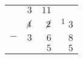 \documentclass{standalone}
\begin{document}
\begin{tabular}{rrrr}
	& {\small $3$} & {\small$11$} &  \\
	& $\cancel{4}$ & $\cancel{2}$ & \textsuperscript{$1$} $3$ \\
	$-$ & $3$ & $6$ & $8$ \\ \hline
	& & $5$ & $5$
\end{tabular}
\end{document}
